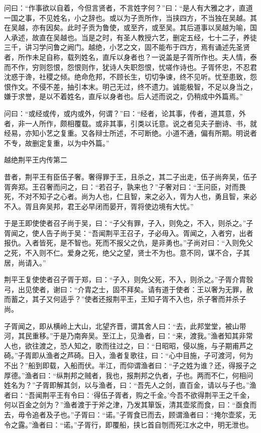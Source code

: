 \documentclass[12pt,UTF8]{ctexbook}
\begin{document}
问曰：“作事欲以自着，今但言贤者，不言姓字何？”曰：“是人有大雅之才，直道一国之事，不见姓名，小之辞也。或以为子贡所作，当挟四方，不当独在吴越。其在吴越，亦有因矣。此时子贡为鲁使，或至齐，或至吴。其后道事以吴越为喻，国人承述，故直在吴越也。当是之时，有圣人教授六艺，删定五经，七十二子，养徒三千，讲习学问鲁之阙门。越绝，小艺之文，固不能布于四方，焉有诵述先圣贤者，所作未足自称，载列姓名，直斥以身者也？一说盖是子胥所作也。夫人情，泰而不作，穷则怨恨，怨恨则作，犹诗人失职怨恨，忧嗟作诗也。子胥怀忠，不忍君沈惑于谗，社稷之倾。绝命危邦，不顾长生，切切争谏，终不见听。忧至患致，怨恨作文。不侵不差，抽引本末。明己无过，终不遗力。诚能极智，不足以身当之，嫌于求誉，是以不着姓名，直斥以身者也。后人述而说之，仍稍成中外篇焉。”

问曰：“或经或传，或内或外，何谓？”曰：“经者，论其事，传者，道其意，外者，非一人所作，颇相覆载。或非其事，引类以讬意。说之者见夫子删诗、书，就经易，亦知小艺之复重。又各辩士所述，不可断绝。小道不通，偏有所期。明说者不专，故删定复重，以为中外篇。”

越绝荆平王内传第二

昔者，荆平王有臣伍子奢。奢得罪于王，且杀之，其二子出走，伍子尚奔吴，伍子胥奔郑。王召奢而问之，曰：“若召子，孰来也？”子奢对曰：“王问臣，对而畏死，不对不知子之心者。尚为人也，仁且智，来之必入，胥为人也，勇且智，来必不入。胥且奔吴邦，君王必早闭而晏开，胥将使边境有大忧。”

于是王即使使者召子尚于吴，曰：“子父有罪，子入，则免之，不入，则杀之。”子胥闻之，使人告子尚于吴：“吾闻荆平王召子，子必毋入。胥闻之，入者穷，出者报仇。入者皆死，是不智也。死而不报父之仇，是非勇也。”子尚对曰：“入则免父之死，不入则不仁。爱身之死，绝父之望，贤士不为也。意不同，谋不合，子其居，尚请入。”

荆平王复使使者召子胥于郑，曰：“子入，则免父死，不入，则杀之。”子胥介胄彀弓，出见使者，谢曰：“介胄之士，固不拜矣。请有道于使者：王以奢为无罪，赦而蓄之，其子又何适乎？”使者还报荆平王，王知子胥不入也，杀子奢而并杀子尚。

子胥闻之，即从横岭上大山，北望齐晋，谓其舍人曰：“去，此邦堂堂，被山带河，其民重移。”于是乃南奔吴。至江上，见渔者，曰：“来，渡我。”渔者知其非常人也，欲往渡之，恐人知之，歌而往过之，曰：“日昭昭，侵以施，与子期甫芦之碕。”子胥即从渔者之芦碕。日入，渔者复歌往，曰：“心中目施，子可渡河，何为不出？”船到即载，入船而伏。半江，而仰谓渔者曰：“子之姓为谁？还，得报子之厚德。”渔者曰：“纵荆邦之贼者，我也，报荆邦之仇者，子也。两而不仁，何相问姓名为？”子胥即解其剑，以与渔者，曰：“吾先人之剑，直百金，请以与子也。”渔者曰：“吾闻荆平王有令曰：‘得伍子胥者，购之千金。’今吾不欲得荆平王之千金，何以百金之剑为？”渔者渡于于斧之津，乃发其箪饭，清其壶浆而食，曰：“亟食而去，毋令追者及子也。”子胥曰：“诺。”子胥食已而去，顾谓渔者曰：“掩尔壶浆，无令之露。”渔者曰：“诺。”子胥行，即覆船，挟匕首自刎而死江水之中，明无泄也。
\end{document}

